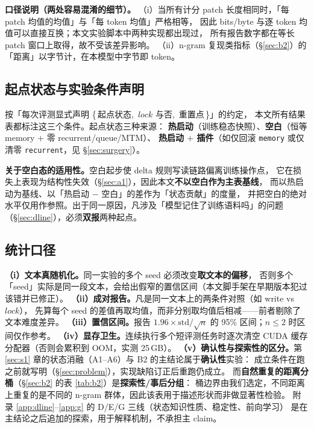 \textbf{口径说明（两处容易混淆的细节）。}
（i）当所有计分 patch 长度相同时，「每 patch 均值的均值」与「每 token 均值」严格相等，
因此 bits/byte 与逐 token 均值可以直接互换；本文实验脚本中两种实现都出现过，
所有报告数字都在等长 patch 窗口上取得，故不受该差异影响。
（ii）$\mathrm{n}$-gram 复现类指标（\S\ref{sec:b2}）的「距离」以字节计，在本模型中字节即 token。

\subsection{起点状态与实验条件声明}\label{sec:cond}

按「每次评测显式声明 \{\,起点状态,\, $\mathit{lock}$ 与否,\, 重置点\,\}」的约定，
本文所有结果表都标注这三个条件。起点状态三种来源：
\textbf{热启动}（训练稳态快照）、\textbf{空白}（恒等 memory $+$ 零 recurrent/queue/MTM）、
\textbf{热启动 $+$ 插件}（如仅回滚 \texttt{memory} 或仅清零 \texttt{recurrent}，见 \S\ref{sec:surgery}）。

\textbf{关于空白态的适用性。}空白起步使 delta 规则写读链路偏离训练操作点，
它在损失上表现为结构性失效（\S\ref{sec:a1}），因此本文\textbf{不以空白作为主表基线}，
而以热启动为基线、以「热启动 $-$ 空白」的差作为「状态贡献」的度量，
并把空白的绝对水平仅用作参照。出于同一原因，凡涉及「模型记住了训练语料吗」的问题
（\S\ref{sec:dline}），必须\textbf{双报}两种起点。

\subsection{统计口径}\label{sec:stats}

\textbf{（i）文本真随机化。}同一实验的多个 seed 必须改变\textbf{取文本的偏移}，
否则多个「seed」实际是同一段文本，会给出假窄的置信区间（本文脚手架在早期版本犯过该错并已修正）。
\textbf{（ii）成对报告。}凡是同一文本上的两条件对照（如 write vs $\mathit{lock}$），
先算每个 seed 的差值再取均值，而非分别取均值后相减——前者剔除了文本难度差异。
\textbf{（iii）置信区间。}报告 $1.96\times\mathrm{std}/\sqrt{n}$ 的 95\% 区间；$n\le2$ 时区间仅作参考。
\textbf{（iv）显存卫生。}连续执行多个短评测任务时逐次清空 CUDA 缓存分配器（否则会累积到 OOM，实测 25\,GB）。
\textbf{（v）确认性与探索性的区分。}第 \ref{sec:s1} 章的状态消融（A1--A6）与 B2 的主结论属于\textbf{确认性}实验：
成立条件在跑之前就写明（\S\ref{sec:problem}），实现缺陷订正后重跑仍成立。
而\textbf{自然重复的距离分桶}（\S\ref{sec:b2} 的表 \ref{tab:b2}）是\textbf{探索性/事后分组}：
桶边界由我们选定，不同距离上重复的是不同的 $\mathrm{n}$-gram 群体，因此该表用于描述形状而非做显著性检验。
附录 \ref{app:dline}--\ref{app:g} 的 D/E/G 三线（状态知识性质、稳定性、前向学习）
是在主结论之后追加的探索，用于解释机制，不承担主 claim。

